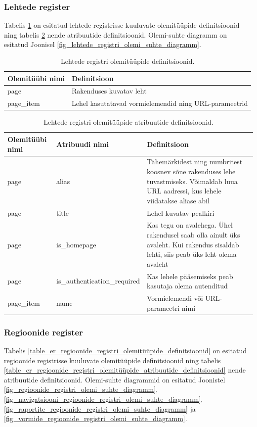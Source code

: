 \documentclass[a4paper,12pt]{article} %
\begin{document}
\subsubsection{Lehtede register}
Tabelis \ref{table_er_lehtede_registri_olemitüüpide_definitsioonid} on esitatud lehtede registrisse kuuluvate olemitüüpide definitsioonid ning tabelis \ref{table_er_lehtede_registri_olemitüüpide_atribuutide_definitsioonid} nende atribuutide definitsioonid. Olemi-suhte diagramm on esitatud Joonisel \ref{fig_lehtede_registri_olemi_suhte_diagramm}.

\begin{table}[H]
\centering
\caption{Lehtede registri olemitüüpide definitsioonid.}
\label{table_er_lehtede_registri_olemitüüpide_definitsioonid}
\begin{tabular}{|p{4cm}|p{11cm}|}
\hline
\rowcolor{rowgray}
Olemitüübi nimi & Definitsioon \\ \hline
page & Rakenduses kuvatav leht \\ \hline
page\_item & Lehel kasutatavad vormielemendid ning URL-parameetrid \\ \hline
\end{tabular}
\end{table}

\begin{table}[H]
\centering
\caption{Lehtede registri olemitüüpide atribuutide definitsioonid.}
\label{table_er_lehtede_registri_olemitüüpide_atribuutide_definitsioonid}
\begin{tabular}{|p{4cm}|p{5cm}|p{6cm}|}
\hline
\rowcolor{rowgray}
Olemitüübi nimi & Atribuudi nimi & Definitsioon \\ \hline
page & alias & Tähemärkidest ning numbritest koosnev sõne rakenduses lehe tuvastmiseks. Võimaldab luua URL aadressi, kus lehele viidatakse aliase abil \\ \hline
page & title & Lehel kuvatav pealkiri \\ \hline
page & is\_homepage & Kas tegu on avalehega. Ühel rakendusel saab olla ainult üks avaleht. Kui rakendus sisaldab lehti, siis peab üks leht olema avaleht \\ \hline
page & is\_authentication\_required & Kas lehele pääsemiseks peab kasutaja olema autenditud \\ \hline
page\_item & name  & Vormielemendi või URL-parameetri nimi \\ \hline
\end{tabular}
\end{table}

\subsubsection{Regioonide register}
Tabelis \ref{table_er_regioonide_registri_olemitüüpide_definitsioonid} on esitatud regioonide registrisse kuuluvate olemitüüpide definitsioonid ning tabelis \ref{table_er_regioonide_registri_olemitüüpide_atribuutide_definitsioonid} nende atribuutide definitsioonid. Olemi-suhte diagrammid on esitatud Joonistel \ref{fig_regioonide_registri_olemi_suhte_diagramm}, \ref{fig_navigatsiooni_regioonide_registri_olemi_suhte_diagramm}, \ref{fig_raportite_regioonide_registri_olemi_suhte_diagramm} ja \ref{fig_vormide_regioonide_registri_olemi_suhte_diagramm}.
\end{document}
